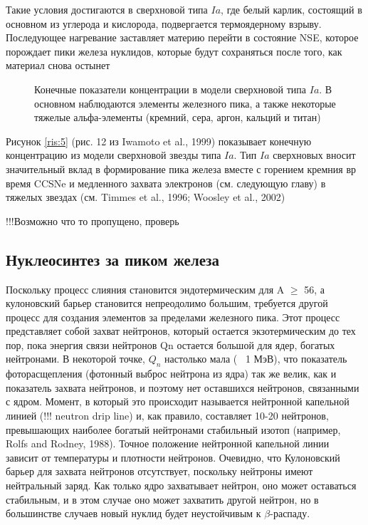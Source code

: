 \documentclass[%
bachelor,    %
natbib,      %
subf,        %
href,        %
colorlinks,  %
]{disser}
\begin{document}
Такие условия достигаются в сверхновой типа $Ia$, где белый карлик, состоящий в основном из углерода и кислорода, подвергается термоядерному взрыву. Последующее нагревание заставляет материю перейти в состояние NSE, которое порождает пики железа нуклидов, которые будут сохраняться после того, как материал снова остынет

\begin{figure}[h]
	\caption{Конечные показатели концентрации в модели сверхновой типа $Ia$. В основном наблюдаются элементы железного пика, а также некоторые тяжелые альфа-элементы (кремний, сера, аргон, кальций и титан)}
\end{figure}

Рисунок \ref{ris:5} (рис. 12 из Iwamoto et al., 1999) показывает конечную концентрацию из модели сверхновой звезды типа $Ia$. Тип $Ia$ сверхновых вносит значительный вклад в формирование пика железа вместе с горением кремния вр время CCSNe и медленного захвата электронов (см. следующую главу) в тяжелых звездах (см. Timmes et al., 1996; Woosley et al., 2002)


\newpage 
!!!Возможно что то пропущено, проверь
\newpage
\subsection{Нуклеосинтез за пиком железа}
Поскольку процесс слияния становится эндотермическим для A $\ge$ 56, а кулоновский барьер становится
непреодолимо большим, требуется другой процесс для создания элементов за пределами железного пика. Этот процесс представляет собой захват нейтронов, который остается экзотермическим до тех пор, пока энергия связи нейтронов Qn остается большой для ядер, богатых нейтронами. В некоторой точке, $Q_n$ настолько мала (~ 1 МэВ), что показатель фоторасщепления (фотонный выброс нейтрона из ядра) так же велик, как и показатель захвата нейтронов, и поэтому нет оставшихся нейтронов, связанными с ядром. Момент, в который это происходит называется нейтронной капельной линией (!!! neutron drip line) и, как правило, составляет 10-20 нейтронов, превышающих наиболее богатый нейтронами стабильный изотоп (например, Rolfs and Rodney, 1988). Точное положение нейтронной капельной линии зависит от температуры и плотности нейтронов. Очевидно, что Кулоновский барьер  для захвата нейтронов отсутствует, поскольку нейтроны имеют нейтральный заряд.
Как только ядро захватывает нейтрон, оно может оставаться стабильным, и в этом случае оно может захватить другой нейтрон, но в большинстве случаев новый нуклид будет неустойчивым к $\beta$-распаду.
\end{document}
